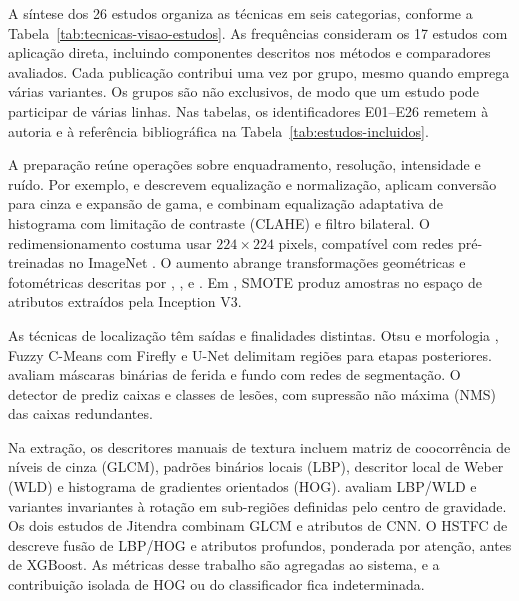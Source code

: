 A síntese dos 26 estudos organiza as técnicas em seis categorias, conforme a
Tabela~\ref{tab:tecnicas-visao-estudos}. As frequências consideram os 17 estudos
com aplicação direta, incluindo componentes descritos nos métodos e comparadores
avaliados. Cada publicação contribui uma vez por grupo, mesmo quando emprega
várias variantes. Os grupos são não exclusivos, de modo que um estudo pode
participar de várias linhas. Nas tabelas, os identificadores E01--E26 remetem à autoria e à
referência bibliográfica na Tabela~\ref{tab:estudos-incluidos}.

A preparação reúne operações sobre enquadramento, resolução, intensidade e ruído.
Por exemplo,  e 
descrevem equalização e normalização,  aplicam conversão
para cinza e expansão de gama, e  combinam equalização
adaptativa de histograma com limitação de contraste (CLAHE) e filtro bilateral.
O redimensionamento costuma usar $224 \times 224$ pixels, compatível com
redes pré-treinadas no ImageNet \cite{pons2026}.
O aumento abrange transformações geométricas e fotométricas descritas por
, ,  e
. Em , SMOTE produz amostras
no espaço de atributos extraídos pela Inception V3.

As técnicas de localização têm saídas e finalidades distintas. Otsu e morfologia
\cite{nyatte2022}, Fuzzy C-Means com Firefly \cite{jitendra2024heuristic} e
U-Net \cite{jitendra2024deep} delimitam regiões para etapas posteriores.
 avaliam máscaras binárias de ferida e fundo com redes
de segmentação. O detector de  prediz caixas e classes de
lesões, com supressão não máxima (NMS) das caixas redundantes.

Na extração, os descritores manuais de textura incluem matriz de coocorrência de
níveis de cinza (GLCM), padrões binários locais (LBP), descritor local de Weber
(WLD) e histograma de gradientes orientados (HOG). 
avaliam LBP/WLD e variantes invariantes à rotação em sub-regiões definidas pelo
centro de gravidade. Os dois estudos de Jitendra combinam GLCM e atributos de CNN.
O HSTFC de  descreve fusão de LBP/HOG e atributos profundos,
ponderada por atenção, antes de XGBoost. As métricas desse trabalho são agregadas
ao sistema, e a contribuição isolada de HOG ou do classificador fica indeterminada.

